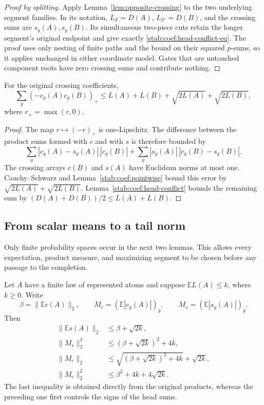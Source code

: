 \begin{proof}[Proof by splitting]
Apply Lemma~\ref{lem:opposite-crossing} to the two underlying
segment families. In its notation,
$L_{\mathcal S}=D(A)$, $L_{\mathcal S'}=D(B)$, and the crossing
sums are $s_g(A),s_g(B)$. Its simultaneous two-piece cuts retain the
longer segment's original endpoint and give exactly
\eqref{stab:coef:head-conflict-eq}. The proof uses only nesting of
finite paths and the bound on their squared $p$-sums, so it applies
unchanged in either coordinate model. Gates that are untouched
component roots have zero crossing sums and contribute nothing.
\end{proof}

\begin{lemma}\label{stab:coef:original-products}
For the original crossing coefficients,
\begin{equation}\label{stab:coef:original-products-eq}
 \sum_g(-c_g(A)c_g(B))_+
 \le L(A)+L(B)+\sqrt{2L(A)}+\sqrt{2L(B)},
\end{equation}
where $r_+=\max(r,0)$.
\end{lemma}

\begin{proof}
The map $r\mapsto(-r)_+$ is one-Lipschitz. The difference between
the product sums formed with $c$ and with $s$ is therefore bounded by
\[
 \sum_g|c_g(A)-s_g(A)|\,|c_g(B)|
 +\sum_g|s_g(A)|\,|c_g(B)-s_g(B)|.
\]
The crossing arrays $c(B)$ and $s(A)$ have Euclidean norms at most
one. Cauchy--Schwarz and Lemma~\ref{stab:coef:pointwise} bound this
error by $\sqrt{2L(A)}+\sqrt{2L(B)}$.
Lemma~\ref{stab:coef:head-conflict} bounds the remaining sum by
$(D(A)+D(B))/2\le L(A)+L(B)$.
\end{proof}

\subsection{From scalar means to a tail norm}
\label{stab:coef:means}

Only finite probability spaces occur in the next two lemmas. This
allows every expectation, product measure, and maximizing segment to
be chosen before any passage to the completion.

\begin{lemma}\label{stab:coef:gate-bound}
Let $A$ have a finite law of represented atoms and suppose
$\mathbb E L(A)\le k$, where $k\ge0$. Write
\[
 \beta=\|\mathbb E c(A)\|_2,\qquad
 M_c=(\mathbb E|c_g(A)|)_g,\qquad
 M_s=(\mathbb E|s_g(A)|)_g.
\]
Then
\begin{align}
 \|\mathbb E s(A)\|_2&\le\beta+\sqrt{2k},
       \label{stab:coef:mean-head}\\
 \|M_s\|_2^2&\le(\beta+\sqrt{2k})^2+4k,
       \label{stab:coef:absolute-head}\\
 \|M_c\|_2&\le\sqrt{(\beta+\sqrt{2k})^2+4k}+\sqrt{2k},
       \label{stab:coef:via-head}\\
 \|M_c\|_2^2&\le\beta^2+4k+4\sqrt{2k}.
       \label{stab:coef:via-products}
\end{align}
The last inequality is obtained directly from the original products,
whereas the preceding one first controls the signs of the head sums.
\end{lemma}

